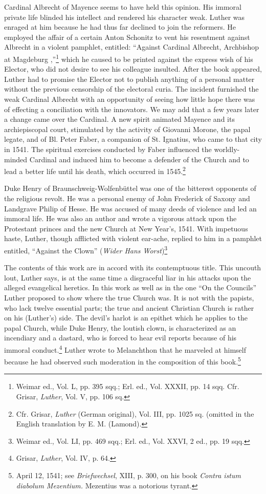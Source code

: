 Cardinal Albrecht of Mayence seems to have held this opinion.
His immoral private life blinded his intellect and rendered his character
weak. Luther was enraged at him because he had thus far declined
to join the reformers. He employed the affair of a certain
Anton Schonitz to vent his resentment against Albrecht in a violent
pamphlet, entitled: “Against Cardinal Albrecht, Archbishop at Magdeburg
,”\footnote
{Weimar ed., Vol. L, pp. 395 sqq.; Erl. ed., Vol. XXXII, pp. 14 sqq. Cfr. Grisar, \textit{Luther},
Vol. V, pp. 106 sq.}
which he caused to be printed against the express wish of
his Elector, who did not desire to see his colleague insulted. After the
book appeared, Luther had to promise the Elector not to publish anything
of a personal matter without the previous censorship of the
electoral curia. The incident furnished the weak Cardinal Albrecht
with an opportunity of seeing how little hope there was of effecting a
conciliation with the innovators. We may add that a few years later
a change came over the Cardinal. A new spirit animated Mayence and
its archiepiscopal court, stimulated by the activity of Giovanni Morone,
the papal legate, and of Bl. Peter Faber, a companion of St.
Ignatius, who came to that city in 1541. The spiritual exercises conducted
by Faber influenced the worldly-minded Cardinal and induced him to become
a defender of the Church and to lead a better
life until his death, which occurred in 1545.\footnote
{Cfr. Grisar, \textit{Luther} (German original), Vol. III, pp. 1025 sq. (omitted in the English
translation by E. M. (Lamond).}

Duke Henry of Braunschweig-Wolfenbüttel was one of the bitterest
opponents of the religious revolt. He was a personal enemy of
John Frederick of Saxony and Landgrave Philip of Hesse. He was
accused of many deeds of violence and led an immoral life. He was
also an author and wrote a vigorous attack upon the Protestant
princes and the new Church at New Year’s, 1541. With impetuous
haste, Luther, though afflicted with violent ear-ache, replied to him
in a pamphlet entitled, “Against the Clown” (\textit{Wider Hans Worst})\footnote{Weimar ed., Vol. LI, pp. 469 sqq.; Erl. ed., Vol. XXVI, 2 ed., pp. 19 sqq.}

The contents of this work are in accord with its contemptuous title.
This uncouth lout, Luther says, is at the same time a disgraceful liar
in his attacks upon the alleged evangelical heretics. In this work as
well as in the one “On the Councils” Luther proposed to show where
the true Church was. It is not with the papists, who lack twelve essential
parts; the true and ancient Christian Church is rather on his
(Luther’s) side. The devil’s harlot is an epithet which he applies to
the papal Church, while Duke Henry, the loutish clown, is characterized
as an incendiary and a dastard, who is forced to hear evil reports
because of his immoral conduct.\footnote{Grisar, \textit{Luther}, Vol. IV, p. 64.}
 Luther wrote to Melanchthon that
he marveled at himself because he had observed such moderation in
the composition of this book.\footnote
{April 12, 1541; see \textit{Briefwechsel}, XIII, p. 300, on his book \textit{Contra istum diabolum Mezentium.}
Mezentius was a notorious tyrant.}

